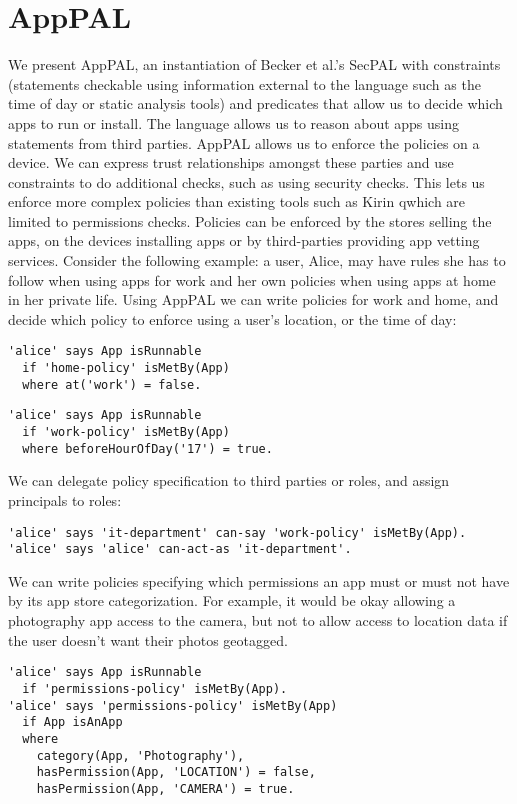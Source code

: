 \documentclass[thesis.tex]{subfiles}
\begin{document}
\chapter{AppPAL}

We present AppPAL, an instantiation of Becker et al.’s
SecPAL\cite{becker_secpal:_2010} with constraints (statements
checkable using information external to the language such as the time
of day or static analysis tools) and predicates that allow us to
decide which apps to run or install. The language allows us to reason
about apps using statements from third parties. AppPAL allows us to
enforce the policies on a device. We can express trust relationships
amongst these parties and use constraints to do additional checks,
such as using security checks. This lets us enforce more complex
policies than existing tools such as Kirin qwhich are limited to
permissions checks. Policies can be enforced by the stores selling the
apps, on the devices installing apps or by third-parties providing app
vetting services.
Consider the following example:
  a user, Alice, may have rules she has to follow when using apps for work and her own policies when using apps at home in her private life.
Using AppPAL we can write policies for work and home, and decide which policy to enforce using a user's location, or the time of day:

\begin{lstlisting}
'alice' says App isRunnable
  if 'home-policy' isMetBy(App)
  where at('work') = false.
\end{lstlisting}
\begin{lstlisting}
'alice' says App isRunnable
  if 'work-policy' isMetBy(App)
  where beforeHourOfDay('17') = true.
\end{lstlisting}

We can delegate policy specification to third parties or roles, and assign principals to roles:

\begin{lstlisting}
'alice' says 'it-department' can-say 'work-policy' isMetBy(App).
'alice' says 'alice' can-act-as 'it-department'.
\end{lstlisting}

We can write policies specifying which permissions an app must or must not have by its app store categorization.
For example, it would be okay allowing a photography app access to the camera, but not to allow access to location data if the user doesn't want their photos geotagged.

\begin{lstlisting}
'alice' says App isRunnable
  if 'permissions-policy' isMetBy(App).
'alice' says 'permissions-policy' isMetBy(App)
  if App isAnApp
  where
    category(App, 'Photography'),
    hasPermission(App, 'LOCATION') = false,
    hasPermission(App, 'CAMERA') = true.
\end{lstlisting}
\end{document}
